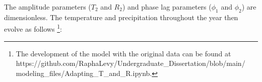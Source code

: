 \vspace{1cm}
The amplitude parameters ($T_2$ and $R_2$) and phase lag 
parameters ($\phi_1$ and $\phi_2$) are dimensionless. 
The temperature and precipitation throughout the year 
then evolve as follows
\footnote{The development of the model with the original data can be found at 
https://github.com/RaphaLevy/Undergraduate\_Dissertation/blob/main/
\\modeling\_files/Adapting\_T\_and\_R.ipynb.}:



